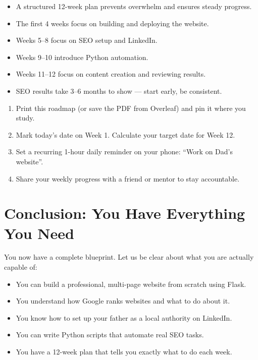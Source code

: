 \documentclass[12pt, a4paper]{book}
\begin{document}
\begin{tcolorbox}[learnedbox]
\begin{itemize}
  \item A structured 12-week plan prevents overwhelm and ensures steady progress.
  \item The first 4 weeks focus on building and deploying the website.
  \item Weeks 5--8 focus on SEO setup and LinkedIn.
  \item Weeks 9--10 introduce Python automation.
  \item Weeks 11--12 focus on content creation and reviewing results.
  \item SEO results take 3--6 months to show --- start early, be consistent.
\end{itemize}
\end{tcolorbox}

\begin{tcolorbox}[taskbox]
\begin{enumerate}
  \item Print this roadmap (or save the PDF from Overleaf) and pin it where you study.
  \item Mark today's date on Week 1. Calculate your target date for Week 12.
  \item Set a recurring 1-hour daily reminder on your phone: ``Work on Dad's website''.
  \item Share your weekly progress with a friend or mentor to stay accountable.
\end{enumerate}
\end{tcolorbox}


\chapter*{Conclusion: You Have Everything You Need}

You now have a complete blueprint. Let us be clear about what you are actually capable of:

\begin{itemize}[leftmargin=1.5em]
  \item You can build a professional, multi-page website from scratch using Flask.
  \item You understand how Google ranks websites and what to do about it.
  \item You know how to set up your father as a local authority on LinkedIn.
  \item You can write Python scripts that automate real SEO tasks.
  \item You have a 12-week plan that tells you exactly what to do each week.
\end{itemize}
\end{document}
